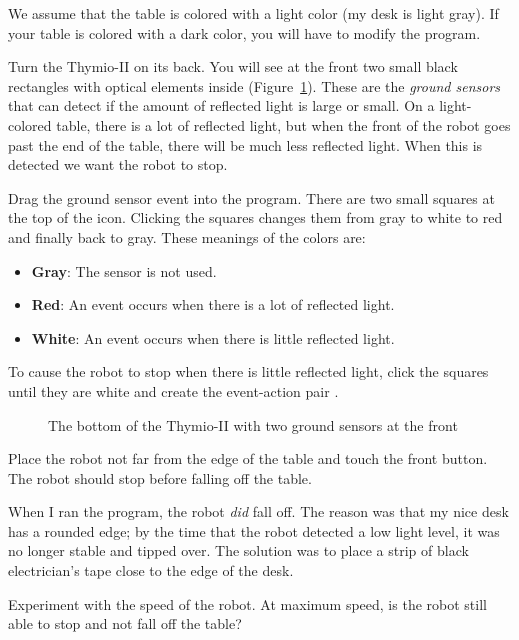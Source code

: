 
We assume that the table is colored with a light color (my desk is light
gray). If your table is colored with a dark color, you will have to
modify the program.

Turn the Thymio-II on its back. You will see at the front two small
black rectangles with optical elements inside (Figure~\ref{fig.bottom}).
These are the \emph{ground sensors} that can detect if the amount of
reflected light is large or small. On a light-colored table, there is a
lot of reflected light, but when the front of the robot goes past the
end of the table, there will be much less reflected light. When this is
detected we want the robot to stop.

Drag the ground sensor event  into the program. There
are two small squares at the top of the icon. Clicking the squares
changes them from gray to white to red and finally back to gray. These
meanings of the colors are:

\begin{itemize}
\item \textbf{Gray}: The sensor is not used.
\item \textbf{Red}: An event occurs when there is a lot of reflected light.
\item \textbf{White}: An event occurs when there is little reflected light.
\end{itemize}

To cause the robot to stop when there is little reflected light, click
the squares until they are white and create the event-action pair
.

\begin{figure}
\begin{center}
\caption{The bottom of the Thymio-II with two ground sensors at the
 front}\label{fig.bottom}
\end{center}
\end{figure}

Place the robot not far from the edge of the table and touch the front
button. The robot should stop before falling off the table.

When I ran the program, the robot \emph{did} fall off. The reason was
that my nice desk has a rounded edge; by the time that the robot
detected a low light level, it was no longer stable and tipped over. The
solution was to place a strip of black electrician's tape close to the
edge of the desk.


Experiment with the speed of the robot. At maximum speed, is the robot
still able to stop and not fall off the table?
